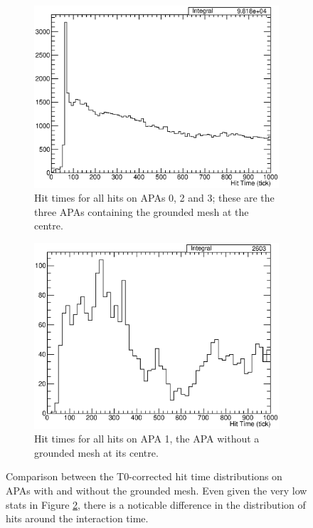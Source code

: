\begin{figure}[htb]
  \centering
  \begin{subfigure}[t]{0.48\linewidth}
    \centering
    \includegraphics[width=\textwidth]{HitTimesAPA023.eps}
    \caption{Hit times for all hits on APAs 0, 2 and 3; these are the three APAs containing the grounded mesh at the centre.}
    \label{fig:HitTimesAPA023}
  \end{subfigure}
  \hfill
  \begin{subfigure}[t]{0.48\linewidth}
    \centering
    \includegraphics[width=\textwidth]{HitTimesAPA1.eps}
    \caption{Hit times for all hits on APA 1, the APA without a grounded mesh at its centre.}
    \label{fig:HitTimesAPA1}
  \end{subfigure}
  \caption[Comparison between the T0-corrected hit time distributions on APAs with and without the grounded mesh.]{Comparison between the T0-corrected hit time distributions on APAs with and without the grounded mesh.  Even given the very low stats in Figure \ref{fig:HitTimesAPA1}, there is a noticable difference in the distribution of hits around the interaction time.}
  \label{fig:HitTimesAPAs}
\end{figure}

